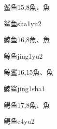 \begin{entry}{鲨鱼}{15,8}{⿂、⿂}
  \begin{phonetics}{鲨鱼}{sha1yu2}
  \end{phonetics}
\end{entry}

\begin{entry}{鲸鱼}{16,8}{⿂、⿂}
  \begin{phonetics}{鲸鱼}{jing1yu2}
  \end{phonetics}
\end{entry}

\begin{entry}{鲸鲨}{16,15}{⿂、⿂}
  \begin{phonetics}{鲸鲨}{jing1sha1}
  \end{phonetics}
\end{entry}

\begin{entry}{鳄鱼}{17,8}{⿂、⿂}
  \begin{phonetics}{鳄鱼}{e4yu2}
  \end{phonetics}
\end{entry}



